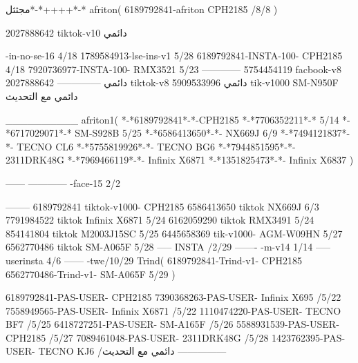 مجثثل*-*++++*-*
afriton(
6189792841-afriton CPH2185  /8/8
)

2027888642 tiktok-v10
دائمي

-in-no-se-16 4/18
1789584913-lse-ins-v1 5/28
6189792841-INSTA-100- CPH2185 4/18
7920736977-INSTA-100- RMX3521 5/23
------------
5754454119 facbook-v8
دائمي
--------------
2027888642 tiktok-v8
دائمي
5909533996 tik-v1000  SM-N950F
دائمي مع التحديث

__________
afriton1(
*-*6189792841*-*-CPH2185
*-*7706352211*-* 5/14
*-*6717029071*-*  SM-S928B 5/25
*-*6586413650*-*- NX669J  6/9
*-*7494121837*-*-  TECNO CL6  \5
*-*5755819926*-*-   TECNO BG6  \5
*-*7944851595*-*-   2311DRK48G  \5
*-*7969466119*-*-   Infinix X6871  \5
*-*1351825473*-*-   Infinix X6837  \5
)


------
------------
-face-15 2/2

--------
6189792841 tiktok-v1000- CPH2185 
6586413650 tiktok NX669J  6/3
7791984522 tiktok Infinix X6871   5/24
6162059290 tiktok RMX3491   5/24
854141804 tiktok M2003J15SC   5/25
6445658369 tik-v1000- AGM-W09HN  5/27
6562770486 tiktok  SM-A065F   5/28
-----
 INSTA /2/29
-------
-m-v14 1/14
-----
userinsta 4/6
------
-twe/10/29
Trind(
6189792841-Trind-v1- CPH2185 
6562770486-Trind-v1- SM-A065F   5/29
)

6189792841-PAS-USER- CPH2185 
7390368263-PAS-USER-  Infinix X695  /5/22
7558949565-PAS-USER-  Infinix X6871  /5/22
1110474220-PAS-USER-  TECNO BF7  /5/25
6418727251-PAS-USER-  SM-A165F  /5/26
5588931539-PAS-USER-  CPH2185  /5/27
7089461048-PAS-USER-  2311DRK48G  /5/28
1423762395-PAS-USER- TECNO KJ6  /دائمي مع التحديث
    ---------------
